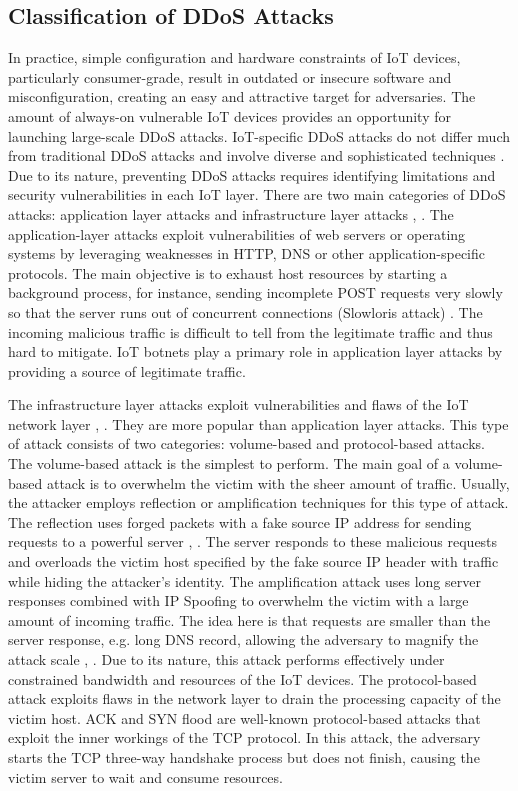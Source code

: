 \documentclass[conference, 11pt]{IEEEtran}
\begin{document}
    \subsection{Classification of DDoS Attacks}
    In practice, simple configuration and hardware constraints of IoT devices, particularly consumer-grade, result in outdated or insecure software and misconfiguration, creating an easy and attractive target for adversaries.
    The amount of always-on vulnerable IoT devices provides an opportunity for launching large-scale DDoS attacks.
    IoT-specific DDoS attacks do not differ much from traditional DDoS attacks and involve diverse and sophisticated techniques \cite{article:14}.
    Due to its nature, preventing DDoS attacks requires identifying limitations and security vulnerabilities in each IoT layer.
    There are two main categories of DDoS attacks: application layer attacks and infrastructure layer attacks \cite{article:14}, \cite{article:8}.
    The application-layer attacks exploit vulnerabilities of web servers or operating systems by leveraging weaknesses in HTTP, DNS or other application-specific protocols.
    The main objective is to exhaust host resources by starting a background process, for instance, sending incomplete POST requests very slowly so that the server runs out of concurrent connections (Slowloris attack) \cite{damon2012hands}.
    The incoming malicious traffic is difficult to tell from the legitimate traffic and thus hard to mitigate.
    IoT botnets play a primary role in application layer attacks by providing a source of legitimate traffic.

    The infrastructure layer attacks exploit vulnerabilities and flaws of the IoT network layer \cite{article:14}, \cite{article:8}.
    They are more popular than application layer attacks.
    This type of attack consists of two categories: volume-based and protocol-based attacks.
    The volume-based attack is the simplest to perform.
    The main goal of a volume-based attack is to overwhelm the victim with the sheer amount of traffic.
    Usually, the attacker employs reflection or amplification techniques for this type of attack.
    The reflection uses forged packets with a fake source IP address for sending requests to a powerful server \cite{article:14}, \cite{article:8}.
    The server responds to these malicious requests and overloads the victim host specified by the fake source IP header with traffic while hiding the attacker's identity.
    The amplification attack uses long server responses combined with IP Spoofing to overwhelm the victim with a large amount of incoming traffic.
    The idea here is that requests are smaller than the server response, e.g. long DNS record, allowing the adversary to magnify the attack scale \cite{article:14}, \cite{article:8}.
    Due to its nature, this attack performs effectively under constrained bandwidth and resources of the IoT devices.
    The protocol-based attack exploits flaws in the network layer to drain the processing capacity of the victim host.
    ACK and SYN flood are well-known protocol-based attacks that exploit the inner workings of the TCP protocol.
    In this attack, the adversary starts the TCP three-way handshake process but does not finish, causing the victim server to wait and consume resources.
\end{document}
